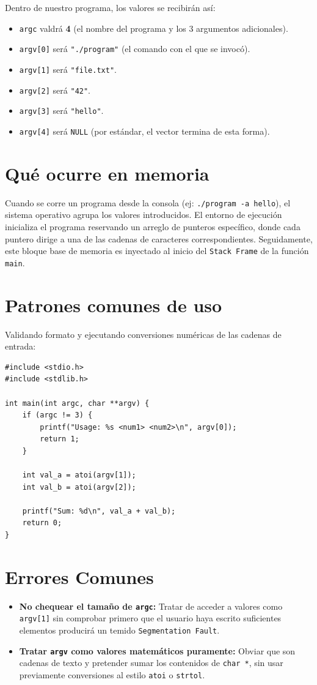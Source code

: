 \documentclass[12pt,a4paper]{article}
\begin{document}
Dentro de nuestro programa, los valores se recibirán así:
\begin{itemize}
    \item \texttt{argc} valdrá \textbf{4} (el nombre del programa y los 3 argumentos adicionales).
    \item \texttt{argv[0]} será \texttt{"./program"} (el comando con el que se invocó).
    \item \texttt{argv[1]} será \texttt{"file.txt"}.
    \item \texttt{argv[2]} será \texttt{"42"}.
    \item \texttt{argv[3]} será \texttt{"hello"}.
    \item \texttt{argv[4]} será \texttt{NULL} (por estándar, el vector termina de esta forma).
\end{itemize}

\section{Qué ocurre en memoria}
Cuando se corre un programa desde la consola (ej: \texttt{./program -a hello}), el sistema operativo agrupa los valores introducidos. El entorno de ejecución inicializa el programa reservando un arreglo de punteros específico, donde cada puntero dirige a una de las cadenas de caracteres correspondientes. Seguidamente, este bloque base de memoria es inyectado al inicio del \texttt{Stack Frame} de la función \texttt{main}.

\section{Patrones comunes de uso}
Validando formato y ejecutando conversiones numéricas de las cadenas de entrada:
\begin{lstlisting}
#include <stdio.h>
#include <stdlib.h>

int main(int argc, char **argv) {
    if (argc != 3) {
        printf("Usage: %s <num1> <num2>\n", argv[0]);
        return 1;
    }
    
    int val_a = atoi(argv[1]);
    int val_b = atoi(argv[2]);
    
    printf("Sum: %d\n", val_a + val_b);
    return 0;
}
\end{lstlisting}

\section{Errores Comunes}
\begin{itemize}
    \item \textbf{No chequear el tamaño de \texttt{argc}:} Tratar de acceder a valores como \texttt{argv[1]} sin comprobar primero que el usuario haya escrito suficientes elementos producirá un temido \texttt{Segmentation Fault}.
    \item \textbf{Tratar \texttt{argv} como valores matemáticos puramente:} Obviar que son cadenas de texto y pretender sumar los contenidos de \texttt{char *}, sin usar previamente conversiones al estilo \texttt{atoi} o \texttt{strtol}.
\end{itemize}
\end{document}
